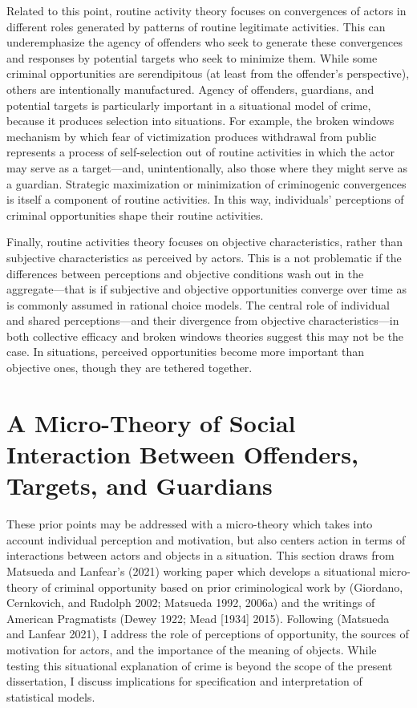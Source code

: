 \documentclass [11pt, proquest] {uwthesis}[2015/03/03]
\begin{document}
Related to this point, routine activity theory focuses on convergences of actors in different roles generated by patterns of routine legitimate activities. This can underemphasize the agency of offenders who seek to generate these convergences and responses by potential targets who seek to minimize them. While some criminal opportunities are serendipitous (at least from the offender's perspective), others are intentionally manufactured. Agency of offenders, guardians, and potential targets is particularly important in a situational model of crime, because it produces selection into situations. For example, the broken windows mechanism by which fear of victimization produces withdrawal from public represents a process of self-selection out of routine activities in which the actor may serve as a target---and, unintentionally, also those where they might serve as a guardian. Strategic maximization or minimization of criminogenic convergences is itself a component of routine activities. In this way, individuals' perceptions of criminal opportunities shape their routine activities.

Finally, routine activities theory focuses on objective characteristics, rather than subjective characteristics as perceived by actors. This is a not problematic if the differences between perceptions and objective conditions wash out in the aggregate---that is if subjective and objective opportunities converge over time as is commonly assumed in rational choice models. The central role of individual and shared perceptions---and their divergence from objective characteristics---in both collective efficacy and broken windows theories suggest this may not be the case. In situations, perceived opportunities become more important than objective ones, though they are tethered together.

\hypertarget{a-micro-theory-of-social-interaction-between-offenders-targets-and-guardians}{%
\section{A Micro-Theory of Social Interaction Between Offenders, Targets, and Guardians}\label{a-micro-theory-of-social-interaction-between-offenders-targets-and-guardians}}

These prior points may be addressed with a micro-theory which takes into account individual perception and motivation, but also centers action in terms of interactions between actors and objects in a situation. This section draws from Matsueda and Lanfear's (2021) working paper which develops a situational micro-theory of criminal opportunity based on prior criminological work by (Giordano, Cernkovich, and Rudolph 2002; Matsueda 1992, 2006a) and the writings of American Pragmatists (Dewey 1922; Mead {[}1934{]} 2015). Following (Matsueda and Lanfear 2021), I address the role of perceptions of opportunity, the sources of motivation for actors, and the importance of the meaning of objects. While testing this situational explanation of crime is beyond the scope of the present dissertation, I discuss implications for specification and interpretation of statistical models.
\end{document}
